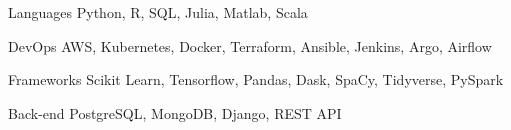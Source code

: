 

\begin{cvskills}

  \cvskill
    {Languages} %
    {Python, R, SQL, Julia, Matlab, Scala} %

  \cvskill
    {DevOps} %
    {AWS, Kubernetes, Docker, Terraform, Ansible, Jenkins, Argo, Airflow} %

  \cvskill
    {Frameworks} %
    {Scikit Learn, Tensorflow, Pandas, Dask, SpaCy, Tidyverse, PySpark} %

  \cvskill
    {Back-end} %
    {PostgreSQL, MongoDB, Django, REST API } %

\end{cvskills}
